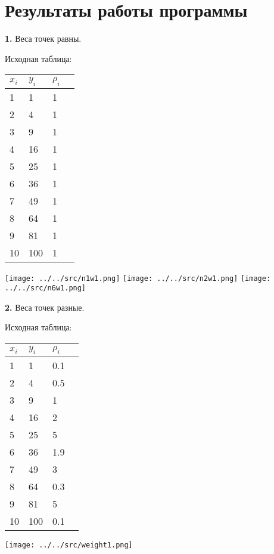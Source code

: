 \documentclass[a4paper,12pt]{article}
\begin{document}
\clearpage %

\section{Результаты работы программы}
\noindent\textbf{1.} Веса точек равны.

\begin{center}
Исходная таблица: 

\begin{center}
	\begin{tabular}{ | l | l | l | p{1cm} |}
		\hline
		$x_{i}$ & $y_{i}$ & $\rho_{i}$ \\ \hline
		1 & 1 & 1 \\ \hline
		2 & 4 & 1 \\ \hline
		3 & 9 & 1 \\ \hline
		4 & 16 & 1 \\ \hline
		5 & 25 & 1 \\ \hline
		6 & 36 & 1 \\ \hline
		7 & 49 & 1 \\ \hline
		8 & 64 & 1 \\ \hline
		9 & 81 & 1 \\ \hline					
		10 & 100 & 1 \\
		\hline
	\end{tabular}
\end{center}

\texttt{[image: ../../src/n1w1.png]} \newline
\texttt{[image: ../../src/n2w1.png]} \newline
\texttt{[image: ../../src/n6w1.png]} \newline
\end{center}

\clearpage
\noindent\textbf{2.} Веса точек разные.

\begin{center}
	Исходная таблица: 

	\begin{center}
		\begin{tabular}{ | l | l | l | p{1cm} |}
			\hline
			$x_{i}$ & $y_{i}$ & $\rho_{i}$ \\ \hline
			1 & 1 & 0.1 \\ \hline
			2 & 4 & 0.5 \\ \hline
			3 & 9 & 1 \\ \hline
			4 & 16 & 2 \\ \hline
			5 & 25 & 5 \\ \hline
			6 & 36 & 1.9 \\ \hline
			7 & 49 & 3 \\ \hline
			8 & 64 & 0.3 \\ \hline
			9 & 81 & 5 \\ \hline					
			10 & 100 & 0.1 \\
			\hline
		\end{tabular}
	\end{center}

	\texttt{[image: ../../src/weight1.png]} \newline\newline
\end{center}
\end{document}
